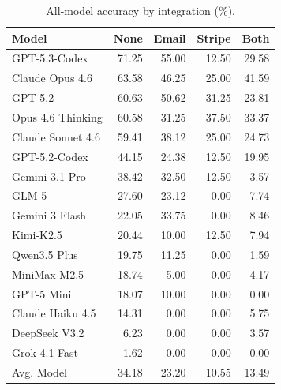 \begin{table}[!h]
\centering
\caption{All-model accuracy by integration (\%).}
\label{tab:all_model_integration_appendix}
\small
\setlength{\tabcolsep}{2pt}
\renewcommand{\arraystretch}{0.9}
\begin{tabular}{@{}lrrrr@{}}
\toprule
\textbf{Model} & \textbf{None} & \textbf{Email} & \textbf{Stripe} & \textbf{Both} \\
\midrule
GPT-5.3-Codex & 71.25 & 55.00 & 12.50 & 29.58 \\
Claude Opus 4.6 & 63.58 & 46.25 & 25.00 & 41.59 \\
GPT-5.2 & 60.63 & 50.62 & 31.25 & 23.81 \\
Opus 4.6 Thinking & 60.58 & 31.25 & 37.50 & 33.37 \\
Claude Sonnet 4.6 & 59.41 & 38.12 & 25.00 & 24.73 \\
GPT-5.2-Codex & 44.15 & 24.38 & 12.50 & 19.95 \\
Gemini 3.1 Pro & 38.42 & 32.50 & 12.50 & 3.57 \\
GLM-5 & 27.60 & 23.12 & 0.00 & 7.74 \\
Gemini 3 Flash & 22.05 & 33.75 & 0.00 & 8.46 \\
Kimi-K2.5 & 20.44 & 10.00 & 12.50 & 7.94 \\
Qwen3.5 Plus & 19.75 & 11.25 & 0.00 & 1.59 \\
MiniMax M2.5 & 18.74 & 5.00 & 0.00 & 4.17 \\
GPT-5 Mini & 18.07 & 10.00 & 0.00 & 0.00 \\
Claude Haiku 4.5 & 14.31 & 0.00 & 0.00 & 5.75 \\
DeepSeek V3.2 & 6.23 & 0.00 & 0.00 & 3.57 \\
Grok 4.1 Fast & 1.62 & 0.00 & 0.00 & 0.00 \\
Avg. Model & 34.18 & 23.20 & 10.55 & 13.49 \\
\bottomrule
\end{tabular}
\end{table}

